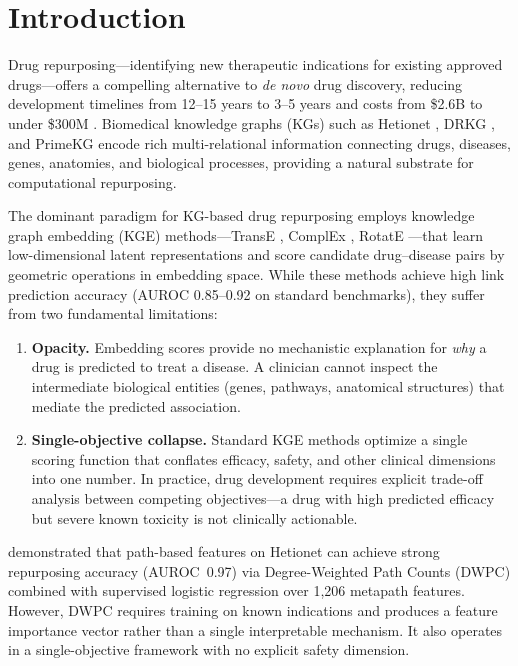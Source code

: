 \documentclass[11pt,a4paper]{article}
\begin{document}
\section{Introduction}
\label{sec:intro}

Drug repurposing---identifying new therapeutic indications for existing
approved drugs---offers a compelling alternative to \textit{de novo}
drug discovery, reducing development timelines from 12--15 years to
3--5 years and costs from \$2.6B to under \$300M
\citep{pushpakom2019drug, ashburn2004drug}. Biomedical knowledge graphs
(KGs) such as Hetionet \citep{himmelstein2017systematic}, DRKG
\citep{ioannidis2020drkg}, and PrimeKG \citep{chandak2023primekg}
encode rich multi-relational information connecting drugs, diseases,
genes, anatomies, and biological processes, providing a natural substrate
for computational repurposing.

The dominant paradigm for KG-based drug repurposing employs knowledge
graph embedding (KGE) methods---TransE \citep{bordes2013translating},
ComplEx \citep{trouillon2016complex}, RotatE \citep{sun2019rotate}---that
learn low-dimensional latent representations and score candidate
drug--disease pairs by geometric operations in embedding space.
While these methods achieve high link prediction accuracy
(AUROC 0.85--0.92 on standard benchmarks), they suffer from two
fundamental limitations:

\begin{enumerate}
    \item \textbf{Opacity.} Embedding scores provide no mechanistic
    explanation for \emph{why} a drug is predicted to treat a disease.
    A clinician cannot inspect the intermediate biological entities
    (genes, pathways, anatomical structures) that mediate the
    predicted association.

    \item \textbf{Single-objective collapse.} Standard KGE methods
    optimize a single scoring function that conflates efficacy, safety,
    and other clinical dimensions into one number. In practice,
    drug development requires explicit trade-off analysis between
    competing objectives---a drug with high predicted efficacy but
    severe known toxicity is not clinically actionable.
\end{enumerate}

\citet{himmelstein2017systematic} demonstrated that path-based features
on Hetionet can achieve strong repurposing accuracy (AUROC~0.97) via
Degree-Weighted Path Counts (DWPC) combined with supervised logistic
regression over 1,206 metapath features. However, DWPC requires
training on known indications and produces a feature importance
vector rather than a single interpretable mechanism. It also operates
in a single-objective framework with no explicit safety dimension.
\end{document}

